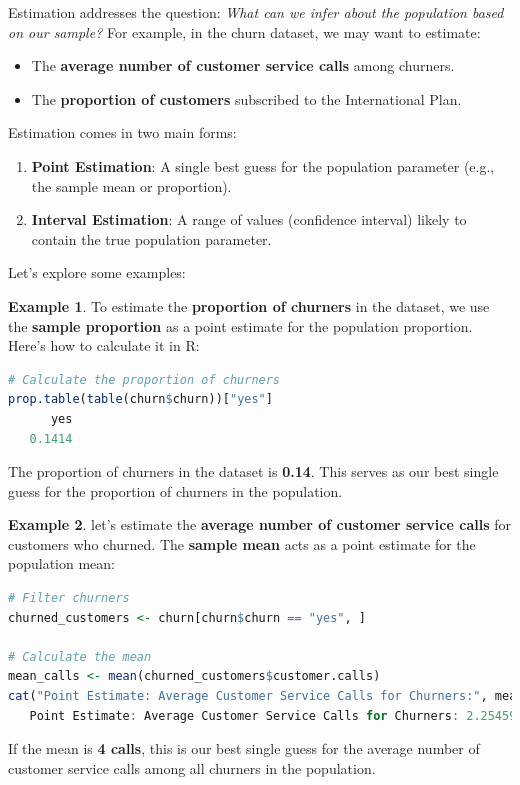 \documentclass[
]{book}
\providecommand{\tightlist}{%
  \setlength{\itemsep}{0pt}\setlength{\parskip}{0pt}}
\theoremstyle{definition}
\theoremstyle{definition}
\newtheorem{example}{Example}[chapter]
\theoremstyle{definition}
\theoremstyle{definition}
\theoremstyle{remark}
\begin{document}
Estimation addresses the question: \emph{What can we infer about the population based on our sample?} For example, in the churn dataset, we may want to estimate:

\begin{itemize}
\tightlist
\item
  The \textbf{average number of customer service calls} among churners.
\item
  The \textbf{proportion of customers} subscribed to the International Plan.
\end{itemize}

Estimation comes in two main forms:

\begin{enumerate}
\def\labelenumi{\arabic{enumi}.}
\tightlist
\item
  \textbf{Point Estimation}: A single best guess for the population parameter (e.g., the sample mean or proportion).\\
\item
  \textbf{Interval Estimation}: A range of values (confidence interval) likely to contain the true population parameter.
\end{enumerate}

Let's explore some examples:

\begin{example}
\protect\hypertarget{exm:ex-est-churn-proportion}{}\label{exm:ex-est-churn-proportion}To estimate the \textbf{proportion of churners} in the dataset, we use the \textbf{sample proportion} as a point estimate for the population proportion. Here's how to calculate it in R:

\begin{lstlisting}[language=R]
# Calculate the proportion of churners
prop.table(table(churn$churn))["yes"]
      yes 
   0.1414
\end{lstlisting}

The proportion of churners in the dataset is \textbf{0.14}. This serves as our best single guess for the proportion of churners in the population.
\end{example}

\begin{example}
\protect\hypertarget{exm:ex-est-service-call}{}\label{exm:ex-est-service-call}let's estimate the \textbf{average number of customer service calls} for customers who churned. The \textbf{sample mean} acts as a point estimate for the population mean:

\begin{lstlisting}[language=R]
# Filter churners
churned_customers <- churn[churn$churn == "yes", ]

# Calculate the mean
mean_calls <- mean(churned_customers$customer.calls)
cat("Point Estimate: Average Customer Service Calls for Churners:", mean_calls)
   Point Estimate: Average Customer Service Calls for Churners: 2.254597
\end{lstlisting}

If the mean is \textbf{4 calls}, this is our best single guess for the average number of customer service calls among all churners in the population.
\end{example}
\end{document}
